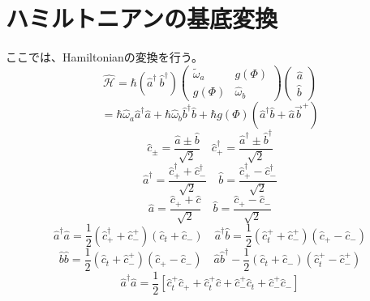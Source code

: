 \section{ハミルトニアンの基底変換}
ここでは、Hamiltonianの変換を行う。
\begin{equation}
    \hat{\mathcal{H}}=\hbar\left(\hat{a}^{\dagger }\ \hat{b}^{\dagger }\right)\left(\begin{array}{cc}
    \tilde{\omega}_{a} & g(\Phi ) \\
    g(\Phi ) & \hat{\omega}_{b}
    \end{array}\right)\left(\begin{array}{l}
    \hat{a} \\
    \hat{b}
    \end{array}\right)
\end{equation}
\begin{equation}
    = \hbar \hat{\omega}_{a} \hat{a}^{\dagger} \hat{a}+\hbar \hat{\omega}_{b} \hat{b}^{\dagger} \hat{b}+\hbar g(\Phi)\left(\hat{a}^{\dagger}\hat{b}+\hat{a} \vec{b}^{+}\right)
\end{equation}
\begin{equation}
    \hat{c}_{\pm}=\frac{\hat{a} \pm \hat{b}}{\sqrt{2}} \quad \hat{c}_{+}^{\dagger}=\frac{\hat{a}^{\dagger} \pm \hat{b}^{\dagger}}{\sqrt{2}}
\end{equation}
\begin{equation}
    \hat{a}^{\dagger}=\frac{\hat{c}_{+}^{\dagger}+\hat{c}_{-}^{\dagger}}{\sqrt{2}} \quad \hat{b}=\frac{\hat{c}_{+}^{\dagger}-\hat{c}_{-}^{\dagger}}{\sqrt{2}}
\end{equation}
\begin{equation}
    \hat{a}=\frac{\hat{c}_{+}+\hat{c}}{\sqrt{2}} \quad \hat{b}=\frac{\hat{c}_{+}-\hat{c}_{-}}{\sqrt{2}}
\end{equation}
\begin{equation}
    \hat{a}^{\dagger} \hat{a}=\frac{1}{2}\left(\hat{c}_{+}^{\dagger}+\hat{c}_{-}^{+}\right)\left(\hat{c}_{t}+\hat{c}_{-}\right) \quad \hat{a}^{\dagger} \hat{b}=\frac{1}{2}\left(\hat{c}_{t}^{+}+\hat{c}_{-}^{+}\right)\left(\hat{c}_{+}-\hat{c}_{-}\right)
\end{equation}
\begin{equation}
    \hat{b} \hat{b}=\frac{1}{2}\left(\hat{c}_{t}+\hat{c}_{-}^{+}\right)\left(\hat{c}_{+}-\hat{c}_{-}\right) \quad \hat{a} \hat{b}^{\dagger}-\frac{1}{2}\left(\hat{c}_{t}+\hat{c}_{-}\right)\left(\hat{c}_{t}^{+}-\hat{c}_{-}^{+}\right)
\end{equation}
\begin{equation}
    \hat{a}^{\dagger} \hat{a}=\frac{1}{2}\left[\hat{c}_{t}^{+} \hat{c}_{+}+\hat{c}_{t}^{+} \hat{c}+\hat{c}_{-}^{+} \hat{c}_{t}+\hat{c}_{-}^{+} \hat{c}_{-}\right]
\end{equation}
